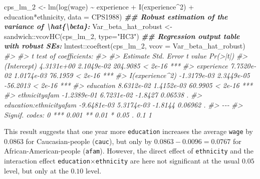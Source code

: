 \documentclass[
  14pt,
]{memoir}
\newenvironment{Shaded}{\begin{snugshade}}{\end{snugshade}}
\newcommand{\AttributeTok}[1]{\textcolor[rgb]{0.77,0.63,0.00}{#1}}
\newcommand{\CommentTok}[1]{\textcolor[rgb]{0.56,0.35,0.01}{\textit{#1}}}
\newcommand{\DecValTok}[1]{\textcolor[rgb]{0.00,0.00,0.81}{#1}}
\newcommand{\DocumentationTok}[1]{\textcolor[rgb]{0.56,0.35,0.01}{\textbf{\textit{#1}}}}
\newcommand{\FunctionTok}[1]{\textcolor[rgb]{0.00,0.00,0.00}{#1}}
\newcommand{\NormalTok}[1]{#1}
\newcommand{\OtherTok}[1]{\textcolor[rgb]{0.56,0.35,0.01}{#1}}
\newcommand{\SpecialCharTok}[1]{\textcolor[rgb]{0.00,0.00,0.00}{#1}}
\newcommand{\StringTok}[1]{\textcolor[rgb]{0.31,0.60,0.02}{#1}}
\begin{document}
\begin{Shaded}
\begin{Highlighting}[]
\NormalTok{cps\_lm\_2 }\OtherTok{\textless{}{-}} \FunctionTok{lm}\NormalTok{(}\FunctionTok{log}\NormalTok{(wage) }\SpecialCharTok{\textasciitilde{}}\NormalTok{ experience }\SpecialCharTok{+} \FunctionTok{I}\NormalTok{(experience}\SpecialCharTok{\^{}}\DecValTok{2}\NormalTok{) }\SpecialCharTok{+} 
\NormalTok{                 education}\SpecialCharTok{*}\NormalTok{ethnicity, }\AttributeTok{data =}\NormalTok{ CPS1988)}
\DocumentationTok{\#\# Robust estimation of the variance of \textbackslash{}hat\{\textbackslash{}beta\}:}
\NormalTok{Var\_beta\_hat\_robust }\OtherTok{\textless{}{-}}\NormalTok{ sandwich}\SpecialCharTok{::}\FunctionTok{vcovHC}\NormalTok{(cps\_lm\_2, }\AttributeTok{type=}\StringTok{"HC3"}\NormalTok{)}
\DocumentationTok{\#\# Regression output table with robust SEs:}
\NormalTok{lmtest}\SpecialCharTok{::}\FunctionTok{coeftest}\NormalTok{(cps\_lm\_2, }\AttributeTok{vcov =}\NormalTok{ Var\_beta\_hat\_robust)}
\CommentTok{\#\textgreater{} }
\CommentTok{\#\textgreater{} t test of coefficients:}
\CommentTok{\#\textgreater{} }
\CommentTok{\#\textgreater{}                            Estimate  Std. Error  t value Pr(\textgreater{}|t|)    }
\CommentTok{\#\textgreater{} (Intercept)              4.3131e+00  2.1049e{-}02 204.9085  \textless{} 2e{-}16 ***}
\CommentTok{\#\textgreater{} experience               7.7520e{-}02  1.0174e{-}03  76.1959  \textless{} 2e{-}16 ***}
\CommentTok{\#\textgreater{} I(experience\^{}2)         {-}1.3179e{-}03  2.3449e{-}05 {-}56.2013  \textless{} 2e{-}16 ***}
\CommentTok{\#\textgreater{} education                8.6312e{-}02  1.4152e{-}03  60.9905  \textless{} 2e{-}16 ***}
\CommentTok{\#\textgreater{} ethnicityafam           {-}1.2389e{-}01  6.7231e{-}02  {-}1.8427  0.06538 .  }
\CommentTok{\#\textgreater{} education:ethnicityafam {-}9.6481e{-}03  5.3174e{-}03  {-}1.8144  0.06962 .  }
\CommentTok{\#\textgreater{} {-}{-}{-}}
\CommentTok{\#\textgreater{} Signif. codes:  0 \textquotesingle{}***\textquotesingle{} 0.001 \textquotesingle{}**\textquotesingle{} 0.01 \textquotesingle{}*\textquotesingle{} 0.05 \textquotesingle{}.\textquotesingle{} 0.1 \textquotesingle{} \textquotesingle{} 1}
\end{Highlighting}
\end{Shaded}

This result suggests that one year more \texttt{education} increases the average \texttt{wage} by \(0.0863\) for Caucasian-people (\texttt{cauc}), but only by \(0.0863 - 0.0096=0.0767\) for African-American-people (\texttt{afam}). However, the direct effect of \texttt{ethnicity} and the interaction effect \texttt{education}\(\times\)\texttt{ethnicity} are here not significant at the usual \(0.05\) level, but only at the \(0.10\) level.
\end{document}

